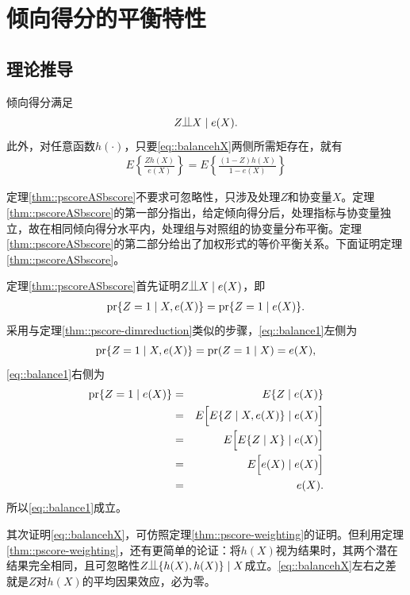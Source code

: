 \section{倾向得分的平衡特性}


\subsection{理论推导}



\begin{theorem}
\label{thm::pscoreASbscore}
倾向得分满足
$$
Z\ind X \mid e(X) .
$$
此外，对任意函数$h(\cdot)$，只要\eqref{eq::balancehX}两侧所需矩存在，就有
\begin{eqnarray}
E\left\{   \frac{Zh(X)}{e(X)}   \right\} = E\left\{   \frac{(1-Z)h(X)}{1-e(X)}   \right\}
\label{eq::balancehX}
\end{eqnarray} 
\end{theorem}

定理\ref{thm::pscoreASbscore}不要求可忽略性，只涉及处理$Z$和协变量$X$。定理\ref{thm::pscoreASbscore}的第一部分指出，给定倾向得分后，处理指标与协变量独立，故在相同倾向得分水平内，处理组与对照组的协变量分布平衡。定理\ref{thm::pscoreASbscore}的第二部分给出了加权形式的等价平衡关系。下面证明定理\ref{thm::pscoreASbscore}。  


\begin{myproof}{定理}{\ref{thm::pscoreASbscore}}首先证明$Z\ind X \mid e(X)$，即
\begin{eqnarray}
\textup{pr}\{Z=1\mid X, e(X)\} = \textup{pr}\{Z=1\mid  e(X)\}.
\label{eq::balance1}
\end{eqnarray}
采用与定理\ref{thm::pscore-dimreduction}类似的步骤，\eqref{eq::balance1}左侧为
$$
\textup{pr}\{Z=1\mid X, e(X)\} = \textup{pr}( Z=1\mid X ) = e(X),
$$
\eqref{eq::balance1}右侧为
\begin{eqnarray*}
\textup{pr}\{Z=1\mid  e(X)\} &=& E\{  Z\mid  e(X) \}  \\
&=& E\Big[ E\{  Z\mid X,  e(X) \} \mid e(X) \Big] \\
&=& E\Big[ E\{  Z\mid X  \} \mid e(X) \Big] \\
&=& E\Big[ e(X) \mid e(X) \Big] \\
&=& e(X). 
\end{eqnarray*}
所以\eqref{eq::balance1}成立。 

其次证明\eqref{eq::balancehX}，可仿照定理\ref{thm::pscore-weighting}的证明。但利用定理\ref{thm::pscore-weighting}，还有更简单的论证：将$h(X)$视为结果时，其两个潜在结果完全相同，且可忽略性$Z\ind \{  h(X), h(X) \}  \mid X$成立。\eqref{eq::balancehX}左右之差就是$Z$对$h(X)$的平均因果效应，必为零。 
\end{myproof}





